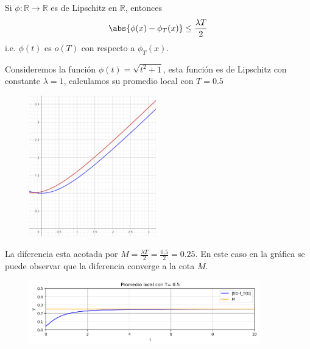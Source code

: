 \documentclass[10pt]{beamer}
\newtheorem{final remarks}{final remarks}[section]
\newtheorem{future work collaboration}{future work collaboration}[section]
\begin{document}

\begin{frame}

    Si $\phi:\mathbb{R}\to\mathbb{R}$ es de Lipschitz en $\mathbb{R}$, entonces
	$$
		\abs{\phi(x)-\phi_T(x)}\leq\frac{\lambda T}{2}
	$$
	i.e. $\phi(t)$ es $o(T)$ con respecto a $\phi_T(x)$.
    
\end{frame}


\begin{frame}
    Consideremos la funci\'on $\phi(t)=\sqrt{t^2+1}$, esta funci\'on es de Lipschitz
	con constante $\lambda=1$, calculamos su promedio local con $T=0.5$
    
	\begin{figure}[h]
		\centering
		\includegraphics[width=5.5cm]{Img/fl.jpg}
	\end{figure}

\end{frame}

\begin{frame}
    La diferencia esta acotada por $M=\frac{\lambda T}{2}=\frac{0.5}{2}=0.25$. 
    En este caso en la 
gr\'afica se puede observar que la diferencia converge a la cota $M$. 
    \begin{figure}[h]
        \centering
        \includegraphics[width=10cm]{Img/d.png}
    \end{figure}
\end{frame}
\end{document}
